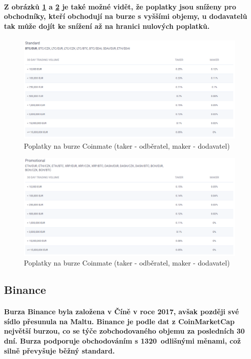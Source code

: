 \documentclass[thesis=B,czech]{FITthesis}[2019/03/21]
\begin{document}
\paragraph{
Z obrázků \ref{coinmate_standard} a \ref{coinmate_promotional} je také možné vidět, že poplatky jsou sníženy pro obchodníky, kteří obchodují na burze s vyššími objemy, u dodavatelů tak může dojít ke snížení až na hranici nulových poplatků. \cite{coinmate_fees}
}
\begin{figure}\centering
	\includegraphics[width=1\textwidth]{images/coinmate_standard.PNG}
	\caption{Poplatky na burze Coinmate (taker - odběratel, maker - dodavatel) \cite{coinmate_fees}}\label{coinmate_standard}
\end{figure}
\begin{figure}\centering
	\includegraphics[width=1\textwidth]{images/coinmate_promotional.PNG}
	\caption{Poplatky na burze Coinmate (taker - odběratel, maker - dodavatel) \cite{coinmate_fees}}\label{coinmate_promotional}
\end{figure}
\subsection{Binance}
\paragraph{
Burza Binance byla založena v Číně v roce 2017, avšak později své sídlo přesunula na Maltu. Binance je podle dat z CoinMarketCap největší burzou, co se týče zobchodovaného objemu za posledních 30 dní. \cite{coinmarketcap} Burza podporuje obchodováním s 1320~odlišnými měnami, což silně převyšuje běžný standard.  
}
\end{document}
